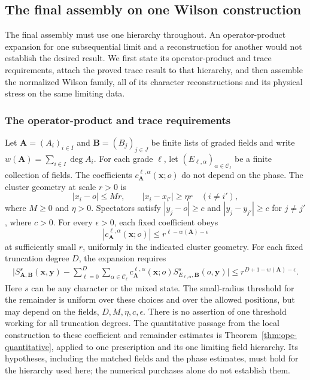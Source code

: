 \subsection{The final assembly on one Wilson construction}
\label{ex-assembly}

The final assembly must use one hierarchy throughout. An operator-product
expansion for one subsequential limit and a reconstruction for another would
not establish the desired result. We first state its operator-product and trace requirements, attach the
proved trace result to that hierarchy, and then assemble the normalized
Wilson family, all of its character reconstructions and its physical stress
on the same limiting data.

\subsubsection{The operator-product and trace requirements}
Let \(\boldsymbol A=(A_i)_{i\in I}\) and
\(\boldsymbol B=(B_j)_{j\in J}\) be finite lists of graded fields and
write \(w(\boldsymbol A)=\sum_{i\in I}\deg A_i\). For each grade
\(\ell\), let \((E_{\ell,\alpha})_{\alpha\in\mathcal C_\ell}\)
be a finite collection of fields. The coefficients
\(c_{\boldsymbol A}^{\ell,\alpha}(\boldsymbol x;o)\) do not depend
on the phase. The cluster geometry at scale \(r>0\) is
\[
 |x_i-o|\le Mr,\qquad |x_i-x_{i'}|\ge\eta r\quad(i\ne i'),
\]
where \(M\ge0\) and \(\eta>0\). Spectators satisfy
\(|y_j-o|\ge c\) and \(|y_j-y_{j'}|\ge c\) for \(j\ne j'\),
where \(c>0\). For every \(\epsilon>0\), each fixed coefficient obeys
\begin{equation}\label{ex-ope-coefficient}
 |c_{\boldsymbol A}^{\ell,\alpha}(\boldsymbol x;o)|
 \le r^{\ell-w(\boldsymbol A)-\epsilon}
\end{equation}
at sufficiently small \(r\), uniformly in the indicated cluster geometry.
For each fixed truncation degree \(D\), the expansion requires
\begin{align}
 \bigg|S^s_{\boldsymbol A,\boldsymbol B}(\boldsymbol x,\boldsymbol y)
 -\sum_{\ell=0}^D\sum_{\alpha\in\mathcal C_\ell}
 c_{\boldsymbol A}^{\ell,\alpha}(\boldsymbol x;o)
 S^s_{E_{\ell,\alpha},\boldsymbol B}(o,\boldsymbol y)\bigg|
 \le r^{D+1-w(\boldsymbol A)-\epsilon}.
 \label{ex-ope-remainder}
\end{align}
Here \(s\) can be any character or the mixed state. The small-radius
threshold for the remainder is uniform over these choices and over the
allowed positions, but may depend on the fields, \(D,M,\eta,c,\epsilon\).
There is no assertion of one threshold working for all truncation degrees.
The quantitative passage from the local construction to these coefficient
and remainder estimates is Theorem~\ref{thm:ope-quantitative}, applied to
one prescription and its one limiting field hierarchy. Its hypotheses,
including the matched fields and the phase estimates, must hold for the
hierarchy used here; the numerical purchases alone do not establish them.

